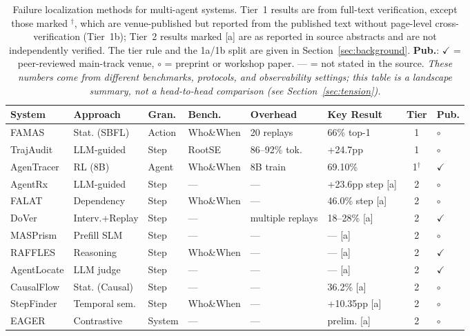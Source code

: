 \begin{table}[t]
\centering
\caption{Failure localization methods for multi-agent systems. Tier~1 results are from full-text verification, except those marked $^\dagger$, which are venue-published but reported from the published text without page-level cross-verification (Tier~1b); Tier~2 results marked [a] are as reported in source abstracts and are not independently verified. The tier rule and the 1a/1b split are given in Section~\ref{sec:background}. \textbf{Pub.}: $\checkmark$ = peer-reviewed main-track venue, $\circ$ = preprint or workshop paper. --- = not stated in the source. \emph{These numbers come from different benchmarks, protocols, and observability settings; this table is a landscape summary, not a head-to-head comparison (see Section~\ref{sec:tension}).}}
\label{tab:failure_loc}
\scriptsize
\setlength{\tabcolsep}{2pt}
\begin{tabular}{@{}p{}p{}lp{}p{}p{}cp{}@{}}
\toprule
\textbf{System} & \textbf{Approach} & \textbf{Gran.} & \textbf{Bench.} & \textbf{Overhead} & \textbf{Key Result} & \textbf{Tier} & \textbf{Pub.} \\
\midrule
FAMAS & Stat. (SBFL) & Action & Who\&When & 20 replays & 66\% top-1 & 1 & $\circ$ \\
TrajAudit & LLM-guided & Step & RootSE & 86--92\% tok. & +24.7pp & 1 & $\circ$ \\
AgenTracer & RL (8B) & Agent & Who\&When & 8B train & 69.10\% & 1$^\dagger$ & $\checkmark$ \\
AgentRx & LLM-guided & Step & --- & --- & +23.6pp step [a] & 2 & $\circ$ \\
FALAT & Dependency & Step & Who\&When & --- & 46.0\% step [a] & 2 & $\circ$ \\
DoVer & Interv.+Replay & Step & --- & multiple replays & 18--28\% [a] & 2 & $\checkmark$ \\
MASPrism & Prefill SLM & Step & --- & --- & --- [a] & 2 & $\circ$ \\
RAFFLES & Reasoning & Step & Who\&When & --- & --- [a] & 2 & $\checkmark$ \\
AgentLocate & LLM judge & Step & --- & --- & --- [a] & 2 & $\checkmark$ \\
CausalFlow & Stat. (Causal) & Step & --- & --- & 36.2\% [a] & 2 & $\circ$ \\
StepFinder & Temporal sem. & Step & Who\&When & --- & +10.35pp [a] & 2 & $\circ$ \\
EAGER & Contrastive & System & --- & --- & prelim. [a] & 2 & $\circ$ \\
\bottomrule
\end{tabular}
\end{table}
